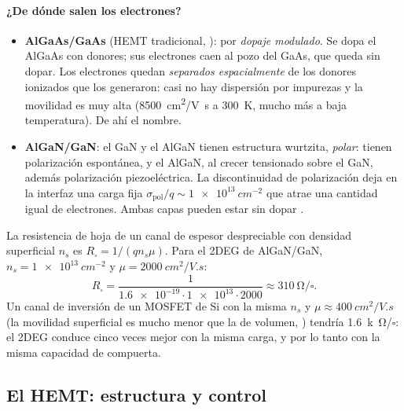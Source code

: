 \paragraph{¿De dónde salen los electrones?}
\begin{itemize}
  \item \textbf{AlGaAs/GaAs} (HEMT tradicional, ): por \emph{dopaje modulado}. Se dopa el
  AlGaAs con donores; sus electrones caen al pozo del GaAs, que queda sin dopar. Los electrones quedan
  \emph{separados espacialmente} de los donores ionizados que los generaron: casi no hay dispersión
  por impurezas y la movilidad es muy alta (\SI{8500}{cm^2/V.s} a \SI{300}{K}, mucho más a baja
  temperatura). De ahí el nombre.
  \item \textbf{AlGaN/GaN}: el GaN y el AlGaN tienen estructura wurtzita, \emph{polar}: tienen
  polarización espontánea, y el AlGaN, al crecer tensionado sobre el GaN, además polarización
  piezoeléctrica. La discontinuidad de polarización deja en la interfaz una carga fija
  $\sigma_{\mathrm{pol}}/q\sim\SI{1e13}{cm^{-2}}$ que atrae una cantidad igual de electrones. Ambas
  capas pueden estar sin dopar .
\end{itemize}

\begin{ejemplo}
La resistencia de hoja de un canal de espesor despreciable con densidad superficial $n_s$ es
$R_\square=1/(qn_s\mu)$. Para el 2DEG de AlGaN/GaN, $n_s=\SI{1e13}{cm^{-2}}$ y
$\mu=\SI{2000}{cm^2/V.s}$:
\[
  R_\square=\frac{1}{\num{1.6e-19}\cdot\num{1e13}\cdot2000}\approx\SI{310}{\ohm}/\square .
\]
Un canal de inversión de un MOSFET de Si con la misma $n_s$ y $\mu\approx\SI{400}{cm^2/V.s}$ (la
movilidad superficial es mucho menor que la de volumen, \munSi) tendría \SI{1.6}{k\ohm}/$\square$: el
2DEG conduce cinco veces mejor con la misma carga, y por lo tanto con la misma capacidad de compuerta.
\end{ejemplo}

\subsection{El HEMT: estructura y control}

